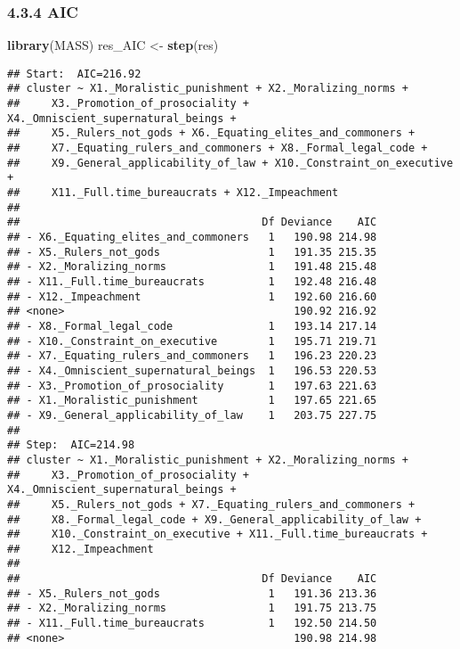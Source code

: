 \documentclass[
]{article}
\newenvironment{Shaded}{\begin{snugshade}}{\end{snugshade}}
\newcommand{\KeywordTok}[1]{\textcolor[rgb]{0.13,0.29,0.53}{\textbf{#1}}}
\newcommand{\NormalTok}[1]{#1}
\newcommand{\StringTok}[1]{\textcolor[rgb]{0.31,0.60,0.02}{#1}}
\begin{document}
\hypertarget{aic}{%
\subsubsection{4.3.4 AIC}\label{aic}}

\begin{Shaded}
\begin{Highlighting}[]
\KeywordTok{library}\NormalTok{(MASS)}
\NormalTok{res_AIC <-}\StringTok{ }\KeywordTok{step}\NormalTok{(res) }
\end{Highlighting}
\end{Shaded}

\begin{verbatim}
## Start:  AIC=216.92
## cluster ~ X1._Moralistic_punishment + X2._Moralizing_norms + 
##     X3._Promotion_of_prosociality + X4._Omniscient_supernatural_beings + 
##     X5._Rulers_not_gods + X6._Equating_elites_and_commoners + 
##     X7._Equating_rulers_and_commoners + X8._Formal_legal_code + 
##     X9._General_applicability_of_law + X10._Constraint_on_executive + 
##     X11._Full.time_bureaucrats + X12._Impeachment
## 
##                                      Df Deviance    AIC
## - X6._Equating_elites_and_commoners   1   190.98 214.98
## - X5._Rulers_not_gods                 1   191.35 215.35
## - X2._Moralizing_norms                1   191.48 215.48
## - X11._Full.time_bureaucrats          1   192.48 216.48
## - X12._Impeachment                    1   192.60 216.60
## <none>                                    190.92 216.92
## - X8._Formal_legal_code               1   193.14 217.14
## - X10._Constraint_on_executive        1   195.71 219.71
## - X7._Equating_rulers_and_commoners   1   196.23 220.23
## - X4._Omniscient_supernatural_beings  1   196.53 220.53
## - X3._Promotion_of_prosociality       1   197.63 221.63
## - X1._Moralistic_punishment           1   197.65 221.65
## - X9._General_applicability_of_law    1   203.75 227.75
## 
## Step:  AIC=214.98
## cluster ~ X1._Moralistic_punishment + X2._Moralizing_norms + 
##     X3._Promotion_of_prosociality + X4._Omniscient_supernatural_beings + 
##     X5._Rulers_not_gods + X7._Equating_rulers_and_commoners + 
##     X8._Formal_legal_code + X9._General_applicability_of_law + 
##     X10._Constraint_on_executive + X11._Full.time_bureaucrats + 
##     X12._Impeachment
## 
##                                      Df Deviance    AIC
## - X5._Rulers_not_gods                 1   191.36 213.36
## - X2._Moralizing_norms                1   191.75 213.75
## - X11._Full.time_bureaucrats          1   192.50 214.50
## <none>                                    190.98 214.98

\end{verbatim}
\end{document}

